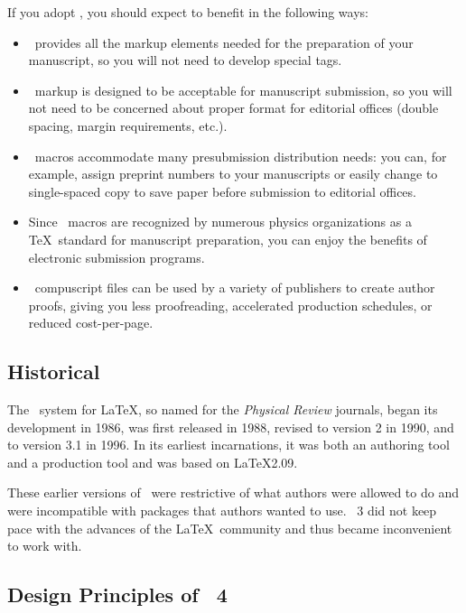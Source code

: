 \documentclass[%
prl%
,twocolumngrid%
,secnumarabic%
,amssymb]{revtex4}
\begin{document}
If you adopt \revtex, you should expect to benefit in the following ways:
%
\begin{itemize}
\item
\revtex\ provides all the markup elements needed for the preparation of your manuscript,
so you will not need to develop special tags.

\item
\revtex\ markup is designed to be acceptable for manuscript submission,
so you will not need to be concerned about proper format for
editorial offices (double spacing, margin requirements, etc.).

\item
\revtex\ macros accommodate many presubmission distribution needs:
you can, for example, assign preprint numbers to your manuscripts
or
easily change to single-spaced copy to save paper before submission to
editorial offices.

\item
Since \revtex\ macros are recognized by numerous physics organizations as
a \TeX\ standard for manuscript preparation,
you can enjoy the benefits of electronic submission programs.

\item
\revtex\ compuscript files can be used by a variety of publishers to create author proofs,
giving you less proofreading,
accelerated production schedules, or reduced cost-per-page.
\end{itemize}

\subsection{Historical}

The \revtex\ system for \LaTeX,
so named for the \emph{Physical Review} journals,
began its development in 1986,
was first released in 1988,
revised to version 2 in 1990,
and to version 3.1 in 1996.
In its earliest incarnations, it was both an authoring tool and a production tool
and was based on \LaTeX2.09.

These earlier versions of \revtex\ were restrictive of
what authors were allowed to do
and
were incompatible with packages that authors wanted to use.
\revtex~3 did not keep pace with the
advances of the \LaTeX\ community and thus became
inconvenient to work with.

\subsection{Design Principles of \revtex~4}
\end{document}
